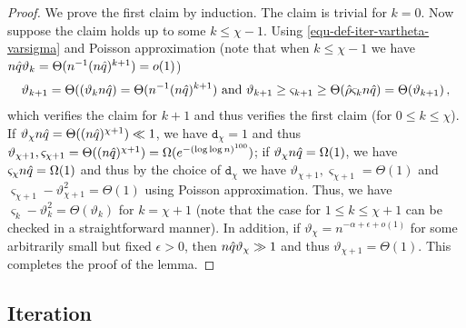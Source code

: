 \documentclass[11pt]{article}
\numberwithin{equation}{section}
\begin{document}
\begin{proof}
We prove the first claim by induction. The claim is trivial for $k=0$. Now suppose the claim holds up to some $k \leq \chi-1$. Using \eqref{equ-def-iter-vartheta-varsigma} and Poisson approximation (note that when $k \leq \chi-1$ we have $n\Hat{q} \vartheta_{k} = \Theta(n^{-1}(n\Hat{q})^{k+1}) = o(1)$)
\begin{align*}
    \vartheta_{k+1} = \Theta((\vartheta_k n \Hat{q}) = \Theta(n^{-1} (n \Hat{q})^{k+1}) \mbox{ and } \vartheta_{k+1} \geq \varsigma_{k+1} \geq \Theta( \Hat{\rho} \varsigma_k n \Hat{q} ) = \Theta(\vartheta_{k+1}) \,,
\end{align*}
which verifies the claim for $k+1$ and thus verifies the first claim (for $ 0 \leq k\leq \chi$). If $\vartheta_{\chi} n \Hat{q} = \Theta ( (n \Hat{q})^{\chi + 1} ) \ll 1$, we have $\mathtt{d}_{\chi} = 1$ and thus $\vartheta_{\chi+1}, \varsigma_{\chi+1} = \Theta( (n \Hat{q})^{\chi+1} ) = \Omega( e^{-(\log \log n)^{100}} )$; if $\vartheta_{\chi} n \Hat{q} = \Omega(1)$, we have $\varsigma_{\chi} n \Hat{q} = \Omega(1)$ and thus by the choice of $\mathtt{d}_{\chi}$ we have $\vartheta_{\chi+1},\varsigma_{\chi+1} = \Theta(1)$ and $\varsigma_{\chi+1}-\vartheta_{\chi+1}^2 = \Theta(1)$ using Poisson approximation. Thus, we have $\varsigma_k - \vartheta_k^2 = \Theta(\vartheta_k)$ for $k = \chi + 1$ (note that the case for $1 \leq k \leq \chi+1$ can be checked in a straightforward manner). In addition,  if $\vartheta_{\chi} = n^{-\alpha+\epsilon+o(1)}$ for some arbitrarily small but fixed $\epsilon>0$, then $n\Hat{q} \vartheta_{\chi} \gg 1$ and thus $\vartheta_{\chi+1} = \Theta(1)$. This completes the proof of the lemma.
\end{proof}









\subsection{Iteration}\label{sec:iteration}
 
\end{document}
